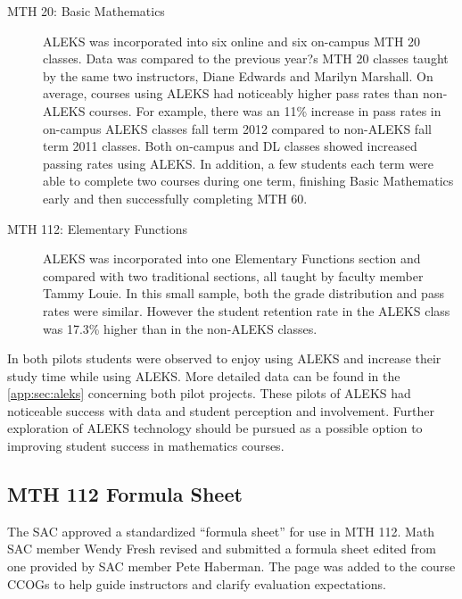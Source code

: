 \begin{description}
\item[MTH 20: Basic Mathematics] ALEKS was incorporated into six online and six
  on-campus MTH 20 classes.  Data was compared to the previous year?s MTH 20
  classes taught by the same two instructors, Diane Edwards and Marilyn
  Marshall.  On average, courses using ALEKS had noticeably higher pass rates
  than non-ALEKS courses.  For example, there was an 11\% increase in pass rates
  in on-campus ALEKS classes fall term 2012 compared to non-ALEKS fall term 2011
  classes.  Both on-campus and DL classes showed increased passing rates using
  ALEKS.  In addition, a few students each term were able to complete two
  courses during one term, finishing Basic Mathematics early and then
  successfully completing MTH 60.

\item[MTH 112: Elementary Functions] ALEKS was incorporated into one Elementary
  Functions section and compared with two traditional sections, all taught by
  faculty member Tammy Louie.  In this small sample, both the grade distribution
  and pass rates were similar.  However the student retention rate in the ALEKS
  class was 17.3\% higher than in the non-ALEKS classes.  
 
 \end{description}
 
In both pilots students were observed to enjoy using ALEKS and increase their
study time while using ALEKS.  More detailed data can be found in the
\vref{app:sec:aleks} concerning both pilot projects. These pilots of ALEKS had
noticeable success with data and student perception and involvement.  Further
exploration of ALEKS technology should be pursued as a possible option to
improving student success in mathematics courses.
 
\subsection{MTH 112 Formula Sheet}
The SAC approved a standardized ``formula sheet'' for use in MTH 112.  Math SAC
member Wendy Fresh revised and submitted a formula sheet edited from one
provided by SAC member Pete Haberman.  The page was added to the course CCOGs to
help guide instructors and clarify evaluation expectations.
 
